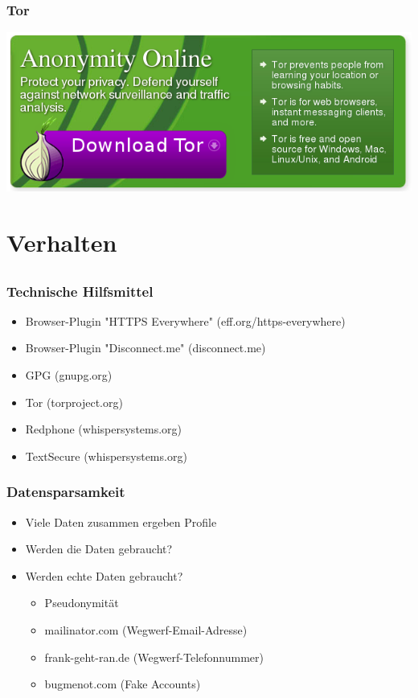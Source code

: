 \documentclass[12pt]{beamer}
\begin{document}
\begin{frame}
    \frametitle{Tor}
    \includegraphics[height=0.5\textheight]{img/tor-banner.png}
\end{frame}

\section{Verhalten}
\subsection{}

\begin{frame}
    \frametitle{Technische Hilfsmittel}
    \begin{itemize}
        \item Browser-Plugin "HTTPS Everywhere" (eff.org/https-everywhere)
        \item Browser-Plugin "Disconnect.me" (disconnect.me)
        \item GPG (gnupg.org)
        \item Tor (torproject.org)
        \item Redphone (whispersystems.org)
        \item TextSecure (whispersystems.org)
    \end{itemize}
\end{frame}

\begin{frame}
    \frametitle{Datensparsamkeit}
    \begin{itemize}
        \item<2-> Viele Daten zusammen ergeben Profile
        \item<3-> Werden die Daten gebraucht?
        \item<4-> Werden echte Daten gebraucht?
            \begin{itemize}
              \item<5-> Pseudonymität
              \item<6-> mailinator.com (Wegwerf-Email-Adresse)
	      \item<7-> frank-geht-ran.de (Wegwerf-Telefonnummer)
              \item<8-> bugmenot.com (Fake Accounts)
            \end{itemize}
    \end{itemize}
\end{frame}
\end{document}
